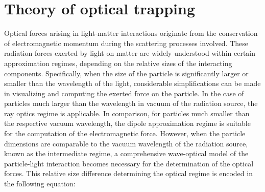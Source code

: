 \documentclass[letterpaper,12pt,oneside]{book}
\begin{document}
\chapter{Theory of optical trapping}
Optical forces arising in light-matter interactions originate from the conservation of electromagnetic momentum during the scattering processes involved. These radiation forces exerted by light on matter are widely understood within certain approximation regimes, depending on the relative sizes of the interacting components. 
Specifically, when the size of the particle is significantly larger or smaller than the wavelength of the light, considerable simplifications can be made in visualizing and computing the exerted force on the particle. In the case of particles much larger than the wavelength in vacuum of the radiation source, the ray optics regime is applicable. In comparison, for particles much smaller than the respective vacuum wavelength, the dipole approximation regime is suitable for the computation of the electromagnetic force. However, when the particle dimensions are comparable to the vacuum wavelength of the radiation source, known as the intermediate regime, a comprehensive wave-optical model of the particle-light interaction becomes necessary for the determination of the optical forces.
This relative size difference determining the optical regime is encoded in the following equation: 


\end{document}
